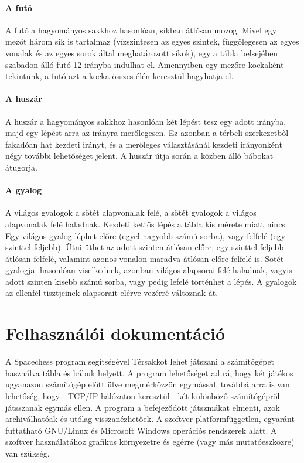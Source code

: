 \documentclass[12pt, twoside]{report}
\begin{document}
\subsubsection{A futó}

A futó a hagyományos sakkhoz hasonlóan, síkban átlósan mozog. Mivel egy mezőt három sík is tartalmaz (vízszintesen az egyes szintek, függőlegesen az egyes vonalak és az egyes sorok által meghatározott síkok), egy a tábla belsejében szabadon álló futó 12 irányba indulhat el. Amennyiben egy mezőre kockaként tekintünk, a futó azt a kocka összes élén keresztül hagyhatja el. 

\subsubsection{A huszár}

A huszár a hagyományos sakkhoz hasonlóan két lépést tesz egy adott irányba, majd egy lépést arra az irányra merőlegesen. Ez azonban a térbeli szerkezetből fakadóan hat kezdeti irányt, és a merőleges választásánál kezdeti irányonként négy további lehetőséget jelent. A huszár útja során a közben álló bábokat átugorja. 

\subsubsection{A gyalog}

A világos gyalogok a sötét alapvonalak felé, a sötét gyalogok a világos alapvonalak felé haladnak. Kezdeti kettős lépés a tábla kis mérete miatt nincs. Egy világos gyalog léphet előre (egyel nagyobb számú sorba), vagy felfelé (egy szinttel feljebb). Ütni üthet az adott szinten átlósan előre, egy szinttel feljebb átlósan felfelé, valamint azonos vonalon maradva átlósan előre felfelé is. Sötét gyalogjai hasonlóan viselkednek, azonban világos alapsorai felé haladnak, vagyis adott szinten kisebb számú sorba, vagy pedig lefelé történhet a lépés. A gyalogok az ellenfél tisztjeinek alapsorait elérve vezérré változnak át.

\chapter{Felhasználói dokumentáció}

A Spacechess program segítségével Térsakkot lehet játszani a számítógépet használva tábla és bábuk helyett. A program lehetőséget ad rá, hogy két játékos ugyanazon számítógép előtt ülve megmérkőzzön egymással, továbbá arra is van lehetőség, hogy - TCP/IP hálózaton keresztül - két különböző számítógépről játsszanak egymás ellen. A program a befejeződött játszmákat elmenti, azok archiválhatóak és utólag visszanézhetőek. A szoftver platformfüggetlen, egyaránt futtatható GNU/Linux és Microsoft Windows operációs rendszerek alatt. A szoftver használatához grafikus környezetre és egérre (vagy más mutatóeszközre) van szükség.
\end{document}
